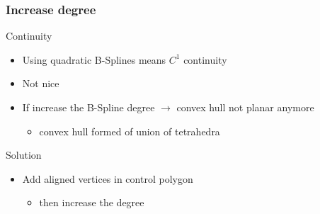\begin{frame}
  \frametitle{Increase degree}
  \begin{block}{Continuity}
    \begin{itemize}
    \item Using \alert{quadratic} B-Splines means \alert{$C^1$} continuity\pause
    \item[\xmark] Not nice
    \end{itemize}
  \end{block}\pause
  \begin{itemize}
  \item[\xmark] If \alert{increase} the B-Spline degree \alert{$\rightarrow$} convex hull not
    \alert{planar} anymore\pause
    \begin{itemize}
    \item convex hull formed of union of \alert{tetrahedra}\pause
    \end{itemize}
  \end{itemize}
  \begin{block}{Solution}
    \begin{itemize}
    \item \alert{Add} aligned vertices in control polygon\pause
      \begin{itemize}
      \item then \alert{increase} the degree
      \end{itemize}
    \end{itemize}
  \end{block}
\end{frame}

